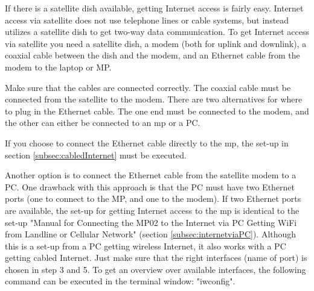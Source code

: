 If there is a satellite dish available, getting Internet access is fairly easy. Internet access via satellite does not use telephone lines or cable systems, but instead utilizes a satellite dish to get two-way data communication. To get Internet access via satellite you need a satellite dish, a modem (both for uplink and downlink), a coaxial cable between the dish and the modem, and an Ethernet cable from the modem to the laptop or MP. 

Make sure that the cables are connected correctly. The coaxial cable must be connected from the satellite to the modem. There are two alternatives for where to plug in the Ethernet cable. The one end must be connected to the modem, and the other can either be connected to an \gls{mp} or a PC.

If you choose to connect the Ethernet cable directly to the \gls{mp}, the set-up in section \ref{subsec:cabledInternet} must be executed. 

Another option is to connect the Ethernet cable from the satellite modem to a PC. One drawback with this approach is that the PC must have two Ethernet ports (one to connect to the MP, and one to the modem). If two Ethernet ports are available, the set-up for getting Internet access to the \gls{mp} is identical to the set-up "Manual for Connecting the MP02 to the Internet via PC Getting WiFi from Landline or Cellular Network" (section \ref{subsec:internetviaPC}). Although this is a set-up from a PC getting wireless Internet, it also works with a PC getting cabled Internet. Just make sure that the right interfaces (name of port) is chosen in step 3 and 5. To get an overview over available interfaces, the following command can be executed in the terminal window: "iwconfig". 


